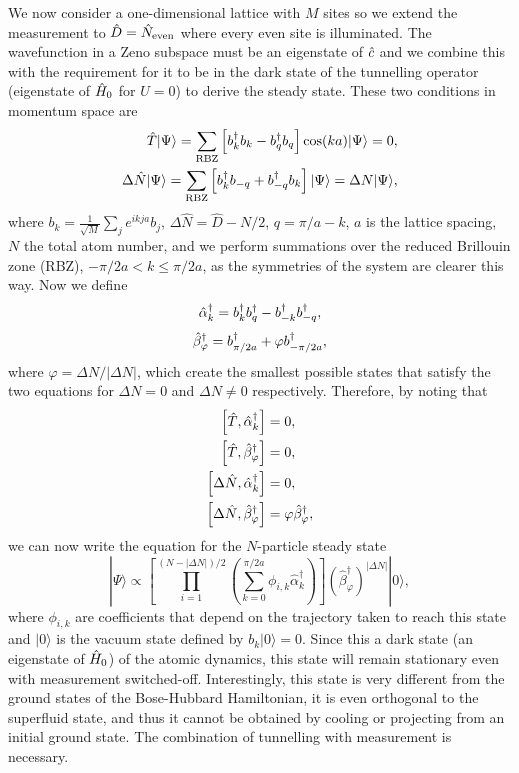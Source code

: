 We now consider a one-dimensional lattice with $M$ sites so we extend
the measurement to $\hat{D} = \hat{N}_\text{even}$ where every even site is
illuminated.  The wavefunction in a Zeno subspace must be an
eigenstate of $\hat{c}$ and we combine this with the requirement for it to
be in the dark state of the tunnelling operator (eigenstate of $\hat{H}_0$
for $U = 0$) to derive the steady state. These two conditions in
momentum space are
\begin{align}
  \hat{T} | \Psi \rangle = \sum_{\text{RBZ}} \left[ b^\dagger_k b_k -
    b^\dagger_{q} b_{q} \right] \cos(ka) |\Psi \rangle = 0, \\
  \Delta \hat{N} |\Psi \rangle = \sum_{\text{RBZ}} \left[ b^\dagger_k b_{-q} +
    b^\dagger_{-q} b_k \right] | \Psi \rangle= \Delta N |\Psi \rangle,
\end{align}
where $b_k = \frac{1}{\sqrt{M}} \sum_j e^{i k j a} b_j$,
$\Delta \hat{N} = \hat{D} - N/2$, $q = \pi/a - k$, $a$ is the lattice
spacing, $N$ the total atom number, and we perform summations over the
reduced Brillouin zone (RBZ), $-\pi/2a < k \le \pi/2a$, as the
symmetries of the system are clearer this way. Now we define
\begin{equation}
\hat{\alpha}_k^\dagger = b^\dagger_k b^\dagger_q - b^\dagger_{-k} b^\dagger_{-q},
\end{equation}
\begin{equation}
\hat{\beta}_\varphi^\dagger = b^\dagger_{\pi/2a} + \varphi b^\dagger_{-\pi/2a},
\end{equation}
where $\varphi = \Delta N / | \Delta N |$, which create the smallest
possible states that satisfy the two equations for $\Delta N = 0$ and
$\Delta N \ne 0$ respectively. Therefore, by noting that
\begin{align}
  \left[ \hat{T}, \hat{\alpha}_k^\dagger \right] & = 0, \\
  \left[ \hat{T}, \hat{\beta}_\varphi^\dagger \right] & = 0, \\
  \left[ \Delta \hat{N}, \hat{\alpha}_k^\dagger \right] & = 0, \\
  \left[ \Delta \hat{N}, \hat{\beta}_\varphi^\dagger \right] & = \varphi
  \hat{\beta}_\varphi^\dagger,
\end{align}
we can now write the equation for the $N$-particle steady state
\begin{equation}
  \label{eq:ss}
  | \Psi \rangle \propto \left[ \prod_{i=1}^{(N - |\Delta N|)/2}
    \left( \sum_{k = 0}^{\pi/2a} \phi_{i,k} \hat{\alpha}_k^\dagger
    \right) \right] \left( \hat{\beta}_\varphi^\dagger \right)^{|
    \Delta N |} | 0 \rangle,
\end{equation}
where $\phi_{i,k}$ are coefficients that depend on the trajectory
taken to reach this state and $|0 \rangle$ is the vacuum state defined
by $b_k |0 \rangle = 0$. Since this a dark state (an eigenstate of
$\hat{H}_0$) of the atomic dynamics, this state will remain stationary even
with measurement switched-off. Interestingly, this state is very
different from the ground states of the Bose-Hubbard Hamiltonian, it
is even orthogonal to the superfluid state, and thus it cannot be
obtained by cooling or projecting from an initial ground state. The
combination of tunnelling with measurement is necessary.

